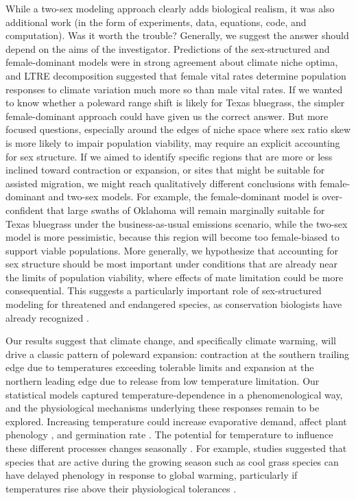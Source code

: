 \documentclass[12pt]{article}\usepackage[]{graphicx}\usepackage[dvipsnames]{xcolor}
\begin{document}
While a two-sex modeling approach clearly adds biological realism, it was also additional work (in the form of experiments, data, equations, code, and computation). 
Was it worth the trouble? 
Generally, we suggest the answer should depend on the aims of the investigator. 
Predictions of the sex-structured and female-dominant models were in strong agreement about climate niche optima, and LTRE decomposition suggested that female vital rates determine population responses to climate variation much more so than male vital rates. 
If we wanted to know whether a poleward range shift is likely for Texas bluegrass, the simpler female-dominant approach could have given us the correct answer. 
But more focused questions, especially around the edges of niche space where sex ratio skew is more likely to impair population viability, may require an explicit accounting for sex structure. 
If we aimed to identify specific regions that are more or less inclined toward contraction or expansion, or sites that might be suitable for assisted migration, we might reach qualitatively different conclusions with female-dominant and two-sex models. 
For example, the female-dominant model is over-confident that large swaths of Oklahoma will remain marginally suitable for Texas bluegrass under the business-as-usual emissions scenario, while the two-sex model is more pessimistic, because this region will become too female-biased to support viable populations. 
More generally, we hypothesize that accounting for sex structure should be most important under conditions that are already near the limits of population viability, where effects of mate limitation could be more consequential. 
This suggests a particularly important role of sex-structured modeling for threatened and endangered species, as conservation biologists have already recognized \citep{milner1994population,jenouvrier2012effects,molnar2010predicting}. 

Our results suggest that climate change, and specifically climate warming, will drive a classic pattern of poleward expansion: contraction at the southern trailing edge due to temperatures exceeding tolerable limits and expansion at the northern leading edge due to release from low temperature limitation. 
Our statistical models captured temperature-dependence in a phenomenological way, and the physiological mechanisms underlying these responses remain to be explored. 
Increasing temperature could increase evaporative demand, affect plant phenology \citep{mclean2016predicting,sherry2007divergence,iler2019reproductive}, and germination rate \citep{reed2021climate}.
The potential for temperature to influence these different processes changes seasonally \citep{konapala2020climate}.
For example, studies suggested that species that are active during the growing season such as cool grass species can have delayed phenology in response to global warming, particularly if temperatures rise above their physiological tolerances \citep{cleland2007shifting, williams2015life}.
\end{document}
